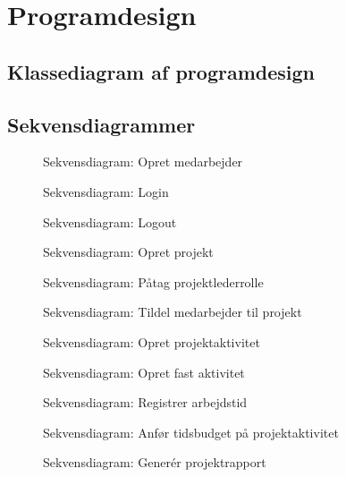 \section{Programdesign}
\subsection{Klassediagram af programdesign}
\subsection{Sekvensdiagrammer}\label{sec:sequence}
\begin{figure}[H]
    \centering
    \caption{Sekvensdiagram: Opret medarbejder}\label{fig:sequenceRegisterEmployee}
\end{figure}
\begin{figure}[H]
    \centering
    \caption{Sekvensdiagram: Login}\label{fig:sequenceLogin}
\end{figure}
\begin{figure}[H]
    \centering
    \caption{Sekvensdiagram: Logout}\label{fig:sequenceLogout}
\end{figure}
\begin{figure}[H]
    \centering
    \caption{Sekvensdiagram: Opret projekt}\label{fig:sequenceCreateProject}
\end{figure}
\begin{figure}[H]
    \centering
    \caption{Sekvensdiagram: Påtag projektlederrolle}\label{fig:sequenceTakePLRole}
\end{figure}
\begin{figure}[H]
    \centering
    \caption{Sekvensdiagram: Tildel medarbejder til projekt}\label{fig:sequenceAssignEmployee}
\end{figure}
\begin{figure}[H]
    \centering
    \caption{Sekvensdiagram: Opret projektaktivitet}\label{fig:sequenceCreateProjectActivity}
\end{figure}
\begin{figure}[H]
    \centering
    \caption{Sekvensdiagram: Opret fast aktivitet}\label{fig:sequenceCreateRegularActivity}
\end{figure}
\begin{figure}[H]
    \centering
    \caption{Sekvensdiagram: Registrer arbejdstid}\label{fig:sequenceRegisterWorktime}
\end{figure}
\begin{figure}[H]
    \centering
    \caption{Sekvensdiagram: Anfør tidsbudget på projektaktivitet}\label{fig:sequenceSetTimeBudget}
\end{figure}
\begin{figure}[H]
    \centering
    \caption{Sekvensdiagram: Generér projektrapport}\label{fig:sequenceGenerateProjectReport}
\end{figure}
\newpage
